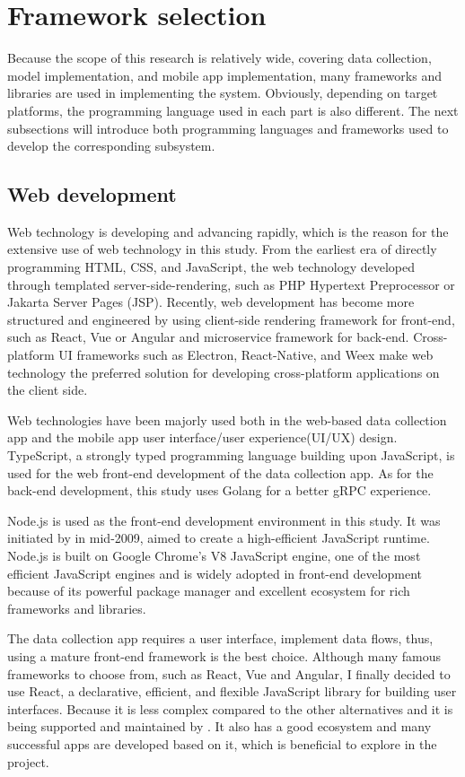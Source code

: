 \section{Framework selection}
\label{sec:Framework selection}
Because the scope of this research is relatively wide, covering data collection, model implementation, and mobile app implementation, many frameworks and libraries are used in implementing the system.
Obviously, depending on target platforms, the programming language used in each part is also different.
The next subsections will introduce both programming languages and frameworks used to develop the corresponding subsystem.

\subsection{Web development}
Web technology is developing and advancing rapidly, which is the reason for the extensive use of web technology in this study.
From the earliest era of directly programming HTML, CSS, and JavaScript, the web technology developed through templated server-side-rendering, such as PHP Hypertext Preprocessor or Jakarta Server Pages (JSP).
Recently, web development has become more structured and engineered by using client-side rendering framework for front-end, such as React, Vue or Angular and microservice framework for back-end.
Cross-platform UI frameworks such as Electron, React-Native, and Weex make web technology the preferred solution for developing cross-platform applications on the client side.

Web technologies have been majorly used both in the web-based data collection app and the mobile app user interface/user experience(UI/UX) design.
TypeScript, a strongly typed programming language building upon JavaScript, is used for the web front-end development of the data collection app.
As for the back-end development, this study uses Golang for a better gRPC experience.

Node.js is used as the front-end development environment in this study.
It was initiated by \citet{nodejs2021} in mid-2009, aimed to create a high-efficient JavaScript runtime.
Node.js is built on Google Chrome's V8 JavaScript engine, one of the most efficient JavaScript engines and is widely adopted in front-end development because of its powerful package manager and excellent ecosystem for rich frameworks and libraries.

The data collection app requires a user interface, implement data flows, thus, using a mature front-end framework is the best choice.
Although many famous frameworks to choose from, such as React, Vue and Angular, I finally decided to use React, a declarative, efficient, and flexible JavaScript library for building user interfaces.
Because it is less complex compared to the other alternatives and it is being supported and maintained by \citet{react2021}.
It also has a good ecosystem and many successful apps are developed based on it, which is beneficial to explore in the project.

